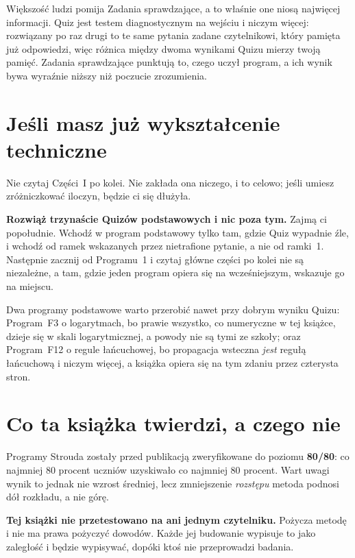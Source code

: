 \noindent
Większość ludzi pomija Zadania sprawdzające, a to właśnie one niosą
najwięcej informacji. Quiz jest testem diagnostycznym na wejściu i niczym
więcej: rozwiązany po raz drugi to te same pytania zadane czytelnikowi, który
pamięta już odpowiedzi, więc różnica między dwoma wynikami Quizu mierzy twoją
pamięć. Zadania sprawdzające punktują to, czego uczył program, a ich wynik
bywa wyraźnie niższy niż poczucie zrozumienia.

\section*{Jeśli masz już wykształcenie techniczne}

Nie czytaj Części~I po kolei. Nie zakłada ona niczego, i to celowo; jeśli
umiesz zróżniczkować iloczyn, będzie ci się dłużyła.

\textbf{Rozwiąż trzynaście Quizów podstawowych i nic poza tym.} Zajmą ci
popołudnie. Wchodź w program podstawowy tylko tam, gdzie Quiz wypadnie źle, i
wchodź od ramek wskazanych przez nietrafione pytanie, a nie od ramki~1.
Następnie zacznij od Programu~1 i czytaj główne części po kolei \dash{} nie
są niezależne, a tam, gdzie jeden program opiera się na wcześniejszym, wskazuje
go na miejscu.

Dwa programy podstawowe warto przerobić nawet przy dobrym wyniku Quizu:
Program~F3 o logarytmach, bo prawie wszystko, co numeryczne w tej książce,
dzieje się w skali logarytmicznej, a powody nie są tymi ze szkoły; oraz
Program~F12 o regule łańcuchowej, bo propagacja wsteczna \emph{jest} regułą
łańcuchową i niczym więcej, a książka opiera się na tym zdaniu przez czterysta
stron.

\section*{Co ta książka twierdzi, a czego nie}

\begin{note}
Programy Strouda zostały przed publikacją zweryfikowane do poziomu
\textbf{80/80}: co najmniej 80 procent uczniów uzyskiwało co najmniej 80
procent. Wart uwagi wynik to jednak nie wzrost średniej, lecz zmniejszenie
\emph{rozstępu} \dash{} metoda podnosi dół rozkładu, a nie górę.

\textbf{Tej książki nie przetestowano na ani jednym czytelniku.} Pożycza metodę
i nie ma prawa pożyczyć dowodów. Każde jej budowanie wypisuje to jako zaległość
i będzie wypisywać, dopóki ktoś nie przeprowadzi badania.
\end{note}

